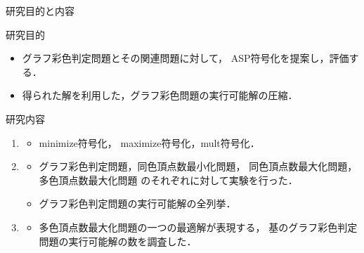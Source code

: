 \documentclass[dvipdfmx,11pt]{beamer}
\begin{document}
\begin{frame}{研究目的と内容}
 \begin{alertblock}{研究目的}%
  \begin{itemize}
   \item グラフ彩色判定問題とその関連問題に対して，
         ASP符号化を提案し，評価する．
   \item 得られた解を利用した，グラフ彩色問題の実行可能解の圧縮．
  \end{itemize}
 \end{alertblock}

 \begin{block}{研究内容}
  \begin{enumerate}
   \item {}
         \begin{itemize}
          \item %
                minimize符号化，
                maximize符号化，mult符号化．
         \end{itemize}
   \item {}
         \begin{itemize}
          \item グラフ彩色判定問題，同色頂点数最小化問題，
                同色頂点数最大化問題，多色頂点数最大化問題
                のそれぞれに対して実験を行った．
          \item グラフ彩色判定問題の実行可能解の全列挙．
         \end{itemize}
   \item {}
         \begin{itemize}
          \item 多色頂点数最大化問題の一つの最適解が表現する，
		基のグラフ彩色判定問題の実行可能解の数を調査した．
         \end{itemize}
  \end{enumerate}
 \end{block}
\end{frame}
\end{document}
